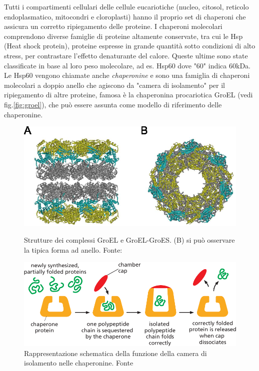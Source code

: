 Tutti i compartimenti cellulari delle cellule eucariotiche (nucleo, citosol, reticolo endoplasmatico, mitocondri e cloroplasti) hanno il proprio set di chaperoni che assicura un corretto ripiegamento delle proteine. I chaperoni molecolari comprendono diverse famiglie di proteine altamente conservate, tra cui le Hsp (Heat shock protein), proteine espresse in grande quantità sotto condizioni di alto stress, per contrastare l'effetto denaturante del calore. Queste ultime sono state classificate in base al loro peso molecolare, ad es. Hsp60 dove "60" indica 60kDa. Le Hsp60 vengono chiamate anche \textit{chaperonine} e sono una famiglia di chaperoni molecolari a doppio anello che agiscono da "camera di isolamento" per il ripiegamento di altre proteine\supercite{ranson1998chaperonins}, famosa è la chaperonina procariotica GroEL (vedi fig.\ref{fig:groel}), che può essere assunta come modello di riferimento delle chaperonine. 

\begin{figure}[h]
	
\end{figure}

\begin{figure}[!htb]
	\includegraphics[scale=0.25]{images/groel.png}
	\caption{Strutture dei complessi GroEL e GroEL-GroES. (B) si può osservare la tipica forma ad anello. Fonte: \cite{Iizuka2016ChaperoninGU}}
	\label{fig:groel}
	\endminipage\hfill
	\centering
	\includegraphics[scale=0.4]{images/chaperone-alberts-isolation.png}
	\caption{Rappresentazione schematica della funzione della camera di isolamento nelle chaperonine. Fonte \cite{alberts2018essential}}
	\label{fig:chaperone-camera}
	\endminipage\hfill
\end{figure}

